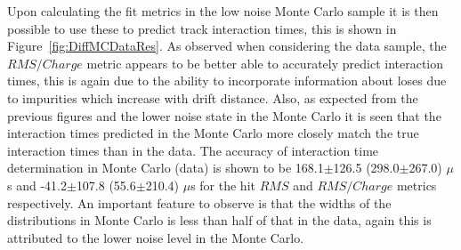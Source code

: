 Upon calculating the fit metrics in the low noise Monte Carlo sample it is then possible to use these to predict track interaction times, this is shown in Figure~\ref{fig:DiffMCDataRes}. As observed when considering the data sample, the $RMS/Charge$ metric appears to be better able to accurately predict interaction times, this is again due to the ability to incorporate information about loses due to impurities which increase with drift distance. Also, as expected from the previous figures and the lower noise state in the Monte Carlo it is seen that the interaction times predicted in the Monte Carlo more closely match the true interaction times than in the data. The accuracy of interaction time determination in Monte Carlo (data) is shown to be 168.1$\pm$126.5 (298.0$\pm$267.0) $\mu$s and -41.2$\pm$107.8 (55.6$\pm$210.4) $\mu$s for the hit $RMS$ and $RMS/Charge$ metrics respectively. An important feature to observe is that the widths of the distributions in Monte Carlo is less than half of that in the data, again this is attributed to the lower noise level in the Monte Carlo.

